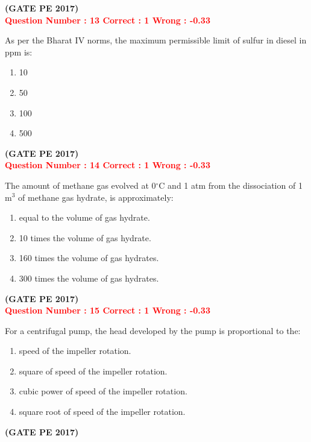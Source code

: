 \documentclass[journal,12pt,onecolumn]{article}
\begin{document}
{\hfill\textbf{(GATE PE 2017)}\\[0.6cm]


\textcolor{red}{\textbf{Question Number : 13 \hfill Correct : 1  Wrong : -0.33}}

As per the Bharat IV norms, the maximum permissible limit of sulfur in diesel in ppm is:

\begin{enumerate}[label=(\Alph*)]
    \item 10
    \item 50
    \item 100
    \item 500
\end{enumerate}

\hfill\textbf{(GATE PE 2017)}\\[0.6cm]


\textcolor{red}{\textbf{Question Number : 14 \hfill Correct : 1  Wrong : -0.33}}

The amount of methane gas evolved at 0$^\circ$C and 1 atm from the dissociation of 1 m$^3$ of methane gas hydrate, is approximately:

\begin{enumerate}[label=(\Alph*)]
    \item equal to the volume of gas hydrate.
    \item 10 times the volume of gas hydrate.
    \item 160 times the volume of gas hydrates.
    \item 300 times the volume of gas hydrates.
\end{enumerate}

\hfill\textbf{(GATE PE 2017)}\\[0.6cm]


\textcolor{red}{\textbf{Question Number : 15 \hfill Correct : 1  Wrong : -0.33}}

For a centrifugal pump, the head developed by the pump is proportional to the:

\begin{enumerate}[label=(\Alph*)]
    \item speed of the impeller rotation.
    \item square of speed of the impeller rotation.
    \item cubic power of speed of the impeller rotation.
    \item square root of speed of the impeller rotation.
\end{enumerate}
\hfill\textbf{(GATE PE 2017)}\\[0.6cm]

}
\end{document}
